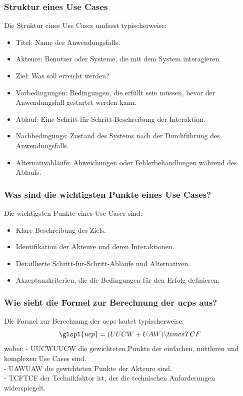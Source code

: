 \documentclass[main.tex]{subfiles}
\begin{document}
\subsubsection*{Struktur eines \glspl{Use Case}}
Die Struktur eines \glspl{Use Case} umfasst typischerweise:
\begin{itemize}
    \item Titel: Name des Anwendungsfalls.
    \item Akteure: Benutzer oder Systeme, die mit dem System interagieren.
    \item Ziel: Was soll erreicht werden?
    \item Vorbedingungen: Bedingungen, die erfüllt sein müssen, bevor der Anwendungsfall gestartet werden kann.
    \item Ablauf: Eine Schritt-für-Schritt-Beschreibung der Interaktion.
    \item \glspl{Nachbedingung}: Zustand des Systems nach der Durchführung des Anwendungsfalls.
    \item Alternativabläufe: Abweichungen oder Fehlerbehandlungen während des Ablaufs.
\end{itemize}

\subsubsection*{Was sind die wichtigsten Punkte eines \glspl{Use Case}?}
Die wichtigsten Punkte eines \glspl{Use Case} sind:
\begin{itemize}
    \item Klare Beschreibung des Ziels.
    \item Identifikation der Akteure und deren Interaktionen.
    \item Detaillierte Schritt-für-Schritt-Abläufe und Alternativen.
    \item Akzeptanzkriterien, die die Bedingungen für den Erfolg definieren.
\end{itemize}

\subsubsection*{Wie sieht die Formel zur Berechnung der \glspl{ucp} aus?}
Die Formel zur Berechnung der \glspl{ucp} lautet typischerweise:
\begin{equation*}
    \glspl{ucp}=(UUCW+UAW) \backslash times TCF
\end{equation*}
wobei:
- UUCWUUCW die gewichteten Punkte der einfachen, mittleren und komplexen \glspl{Use Case} sind. \\
- UAWUAW die gewichteten Punkte der Akteure sind. \\
- TCFTCF der Technikfaktor ist, der die technischen Anforderungen widerspiegelt.
\end{document}
